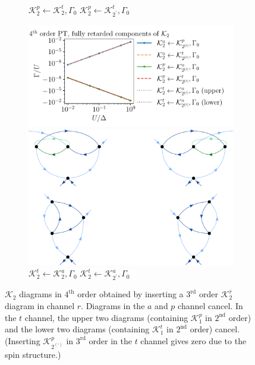 \documentclass[10pt]{scrartcl}
\newcommand{\Ktot}[1]{\mathcal{K}_#1}
\newcommand{\K}[2]{\mathcal{K}_#1^#2}
\newcommand{\Kb}[2]{\mathcal{K}_{#1^\prime}^{#2}}
\begin{document}
\begin{figure}[h!]
\begin{subfigure}[c]{0.4\textwidth}
\\
\phantom{.}\hspace{0.45cm} $\K2p \leftarrow \K2t, \Gamma_0$ \hspace{1.1cm} $\K2p \leftarrow \Kb2t, \Gamma_0$
\end{subfigure}
\begin{subfigure}[c]{0.4\textwidth}
\includegraphics[scale=0.65]{plots/PT4_K2_2d}
\\
\phantom{.}\hspace{0.45cm}
\includegraphics[scale=0.3]{diagrams/PT4_K2t_2d_a}
\\
\phantom{.}\hspace{0.6cm} $\K2t \leftarrow \K2a, \Gamma_0$ \hspace{1.4cm} $\K2t \leftarrow \Kb2a, \Gamma_0$
\end{subfigure}
\caption{$\Ktot2$ diagrams in $4^\text{th}$ order obtained by inserting a $3^\text{rd}$ order $\K{2}{{\bar{r}}}$ diagram in channel $r$. Diagrams in the $a$ and $p$ channel cancel. In the $t$ channel, the upper two diagrams (containing $\K1p$ in $2^\text{nd}$ order) and the lower two diagrams (containing $\K1t$ in $2^\text{nd}$ order) cancel. (Inserting $\K{{2^{(\prime)}}}{p}$ in $3^\text{rd}$ order in the $t$ channel gives zero due to the spin structure.)}
\end{figure}
\end{document}
